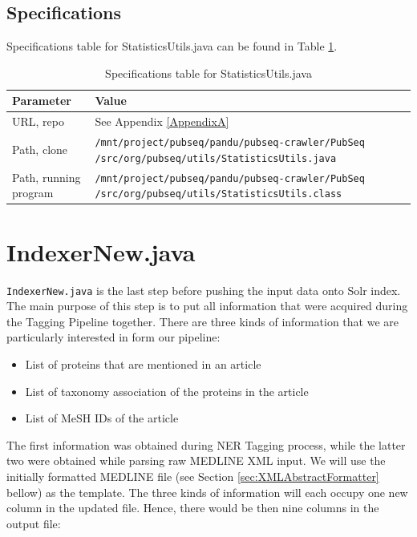 \subsection{Specifications}

Specifications table for StatisticsUtils.java can be found in Table \ref{tab:StatisticsUtils}.

\begin{table}[htbp]
\caption{Specifications table for StatisticsUtils.java}
\centering
\begin{tabularx}{\textwidth}{ | l | X | }
  \hline
  Parameter & Value \\
  \hline
  URL, repo & See Appendix \ref{AppendixA} \\
  Path, clone & \texttt{/mnt/project/pubseq/pandu/pubseq-crawler/PubSeq /src/org/pubseq/utils/StatisticsUtils.java} \\
  Path, running program & \texttt{/mnt/project/pubseq/pandu/pubseq-crawler/PubSeq /src/org/pubseq/utils/StatisticsUtils.class}\\
  \hline
\end{tabularx}
\label{tab:StatisticsUtils}
\end{table}


\section{IndexerNew.java}

\texttt{IndexerNew.java} is the last step before pushing the input data onto Solr index. The main purpose of this step is to put all information that were acquired during the Tagging Pipeline together. There are three kinds of information that we are particularly interested in form our pipeline:

\begin{itemize}
\item List of proteins that are mentioned in an article
\item List of taxonomy association of the proteins in the article
\item List of MeSH IDs of the article
\end{itemize}

The first information was obtained during NER Tagging process, while the latter two were obtained while parsing raw MEDLINE XML input. We will use the initially formatted MEDLINE file (see Section \ref{sec:XMLAbstractFormatter} bellow) as the template. The three kinds of information will each occupy one new column in the updated file. Hence, there would be then nine columns in the output file:


